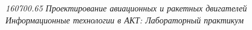 \begin{flushright}
\begin{scriptsize}
\textit{160700.65   Проектирование авиационных и ракетных двигателей\\
 Информационные технологии в АКТ: Лабораторный практикум} \\
\end{scriptsize}
\end{flushright}